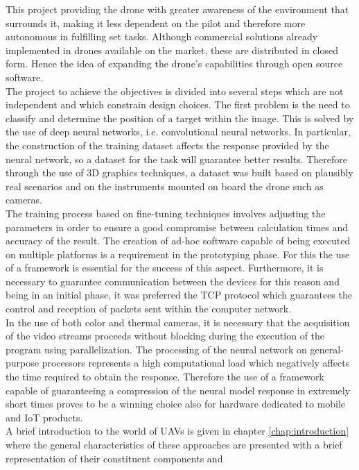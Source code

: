 \noindent This project providing the drone with greater awareness of the
environment that surrounds it, making it less dependent on the  pilot and
therefore more autonomous in fulfilling set tasks.
Although commercial solutions already implemented in drones available on the 
market, these are distributed in closed form.
Hence the idea of expanding the drone's capabilities through open source 
software.\\
The project to achieve the objectives is divided into several steps which are
not independent and which constrain design choices. The first problem is
the need to classify and determine the position of a target within the image. 
This is solved by the use of deep neural networks, i.e. convolutional neural
networks. 
In particular, the construction of the training dataset affects the response
provided by the neural network, so a dataset for the task will guarantee better
results. 
Therefore through the use of 3D graphics techniques, a dataset was built based
on plausibly real scenarios and on the instruments mounted on board the drone
such as cameras.\\
The training process based on fine-tuning techniques involves adjusting the
parameters in order to ensure a good compromise between calculation times and
accuracy of the result. The creation of ad-hoc software capable of being
executed on multiple platforms is a requirement in the prototyping phase. For
this the use of a framework is essential for the success of this aspect. 
Furthermore, it is necessary to guarantee communication between the devices for
this reason and being in an initial phase, it was preferred the TCP protocol 
which guarantees the control and reception of packets sent within the computer 
network.\\ 
In the use of both color and thermal cameras, it is necessary that the
acquisition of the video streams proceeds without blocking during the execution
of the program using parallelization. 
The processing of the neural network on general-purpose processors represents a
high computational load which negatively affects the time required to obtain the
response.
Therefore the use of a framework capable of guaranteeing a
compression of the neural model response in extremely short times proves to be a 
winning choice also for hardware dedicated to mobile and IoT products.\\
\noindent A brief introduction to the world of UAVs is given in chapter
\ref{chap:introduction} where the general characteristics of these approaches
are presented with a brief representation of their constituent components and
